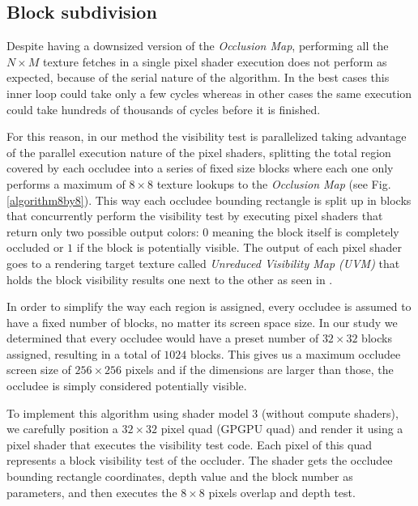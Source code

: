 \documentclass[10pt, conference]{IEEEtran}
\begin{document}
\subsection{Block subdivision}
%
Despite having a downsized version of the \emph{Occlusion Map}, performing all the $N \times M$ texture fetches in a single pixel shader execution 
does not perform as expected, because of the serial nature of the algorithm. 
In the best cases this inner loop could take only a few cycles whereas in other cases the same execution could take hundreds of thousands of cycles before it is finished.\

For this reason, in our method the visibility test is parallelized taking advantage of the parallel execution nature of the pixel shaders, 
splitting the total region covered by each occludee into a series of fixed size blocks where each one only performs 
a maximum of $8 \times 8$ texture lookups to the \emph{Occlusion Map} (see Fig. \ref{algorithm8by8}). 
This way each occludee bounding rectangle is split up in blocks that concurrently perform the visibility test by executing pixel shaders that 
return only two possible output colors: $0$ meaning the block itself is completely occluded or $1$ if the block is potentially visible. 
The output of each pixel shader goes to a rendering target texture called \emph{Unreduced Visibility Map (UVM)} that holds 
the block visibility results one next to the other as seen in . 

In order to simplify the way each region is assigned, every occludee is assumed to have a fixed number of blocks, no matter its screen space size. 
In our study we determined that every occludee would have a preset number of $32 \times 32$ blocks assigned, resulting in a total of $1024$ blocks. 
This gives us a maximum occludee screen size of $256 \times 256$ pixels and if the dimensions are larger than those, the occludee is simply considered potentially visible.\

To implement this algorithm using shader model 3 (without compute shaders), we carefully position a $32 \times 32$ pixel quad (GPGPU quad) and render it using a pixel 
shader that executes the visibility test code. 
Each pixel of this quad represents a block visibility test of the occluder. 
The shader gets the occludee bounding rectangle coordinates, depth value and the block number as parameters, and then executes the $8 \times 8$ pixels 
overlap and depth test.\
\end{document}
